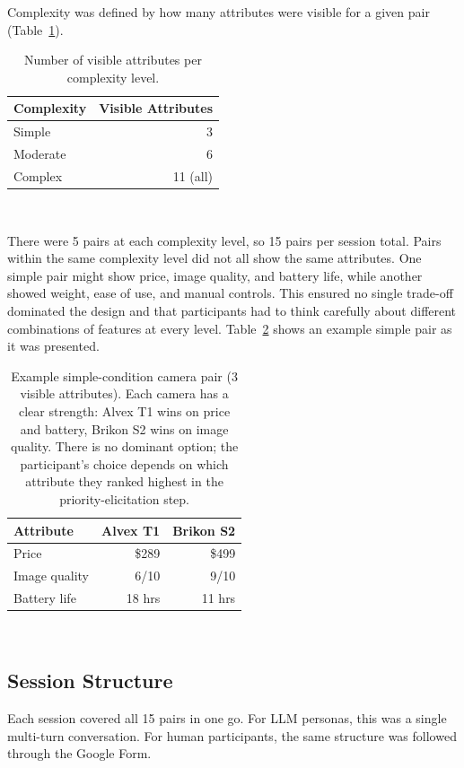 \documentclass{sigchi-ext}
\begin{document}
Complexity was defined by how many attributes were visible for a given pair (Table~\ref{tab:complexity}).

\begin{table}[h]
  \centering
  \begin{tabular}{l r}
    \toprule
    \textbf{Complexity} & \textbf{Visible Attributes} \\
    \midrule
    Simple   & 3 \\
    Moderate & 6 \\
    Complex  & 11 (all) \\
    \bottomrule
  \end{tabular}
  \caption{Number of visible attributes per complexity level.}~\label{tab:complexity}
\end{table}

There were 5 pairs at each complexity level, so 15 pairs per session total. Pairs within the same complexity level did not all show the same attributes. One simple pair might show price, image quality, and battery life, while another showed weight, ease of use, and manual controls. This ensured no single trade-off dominated the design and that participants had to think carefully about different combinations of features at every level. Table~\ref{tab:camera-pair} shows an example simple pair as it was presented.

\begin{table}[h]
  \centering
  \begin{tabular}{l r r}
    \toprule
    \textbf{Attribute} & \textbf{Alvex T1} & \textbf{Brikon S2} \\
    \midrule
    Price          & \$289   & \$499   \\
    Image quality  & 6/10    & 9/10    \\
    Battery life   & 18 hrs  & 11 hrs  \\
    \bottomrule
  \end{tabular}
  \caption{Example simple-condition camera pair (3 visible attributes). Each camera has a clear strength: Alvex T1 wins on price and battery, Brikon S2 wins on image quality. There is no dominant option; the participant's choice depends on which attribute they ranked highest in the priority-elicitation step.}~\label{tab:camera-pair}
\end{table}

\subsection{Session Structure}
Each session covered all 15 pairs in one go. For LLM personas, this was a single multi-turn conversation. For human participants, the same structure was followed through the Google Form.
\end{document}
